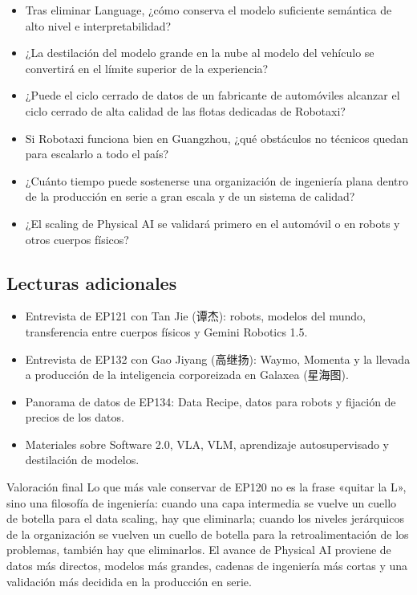 \documentclass[a4paper]{article}
\begin{document}
\begin{itemize}
\item Tras eliminar Language, ¿cómo conserva el modelo suficiente semántica de alto nivel e interpretabilidad?
\item ¿La destilación del modelo grande en la nube al modelo del vehículo se convertirá en el límite superior de la experiencia?
\item ¿Puede el ciclo cerrado de datos de un fabricante de automóviles alcanzar el ciclo cerrado de alta calidad de las flotas dedicadas de Robotaxi?
\item Si Robotaxi funciona bien en Guangzhou, ¿qué obstáculos no técnicos quedan para escalarlo a todo el país?
\item ¿Cuánto tiempo puede sostenerse una organización de ingeniería plana dentro de la producción en serie a gran escala y de un sistema de calidad?
\item ¿El scaling de Physical AI se validará primero en el automóvil o en robots y otros cuerpos físicos?
\end{itemize}

\subsection{Lecturas adicionales}

\begin{itemize}
\item Entrevista de EP121 con Tan Jie (谭杰): robots, modelos del mundo, transferencia entre cuerpos físicos y Gemini Robotics 1.5.
\item Entrevista de EP132 con Gao Jiyang (高继扬): Waymo, Momenta y la llevada a producción de la inteligencia corporeizada en Galaxea (星海图).
\item Panorama de datos de EP134: Data Recipe, datos para robots y fijación de precios de los datos.
\item Materiales sobre Software 2.0, VLA, VLM, aprendizaje autosupervisado y destilación de modelos.
\end{itemize}

\begin{importantbox}{Valoración final}
Lo que más vale conservar de EP120 no es la frase «quitar la L», sino una filosofía de ingeniería: cuando una capa intermedia se vuelve un cuello de botella para el data scaling, hay que eliminarla; cuando los niveles jerárquicos de la organización se vuelven un cuello de botella para la retroalimentación de los problemas, también hay que eliminarlos. El avance de Physical AI proviene de datos más directos, modelos más grandes, cadenas de ingeniería más cortas y una validación más decidida en la producción en serie.
\end{importantbox}
\end{document}
